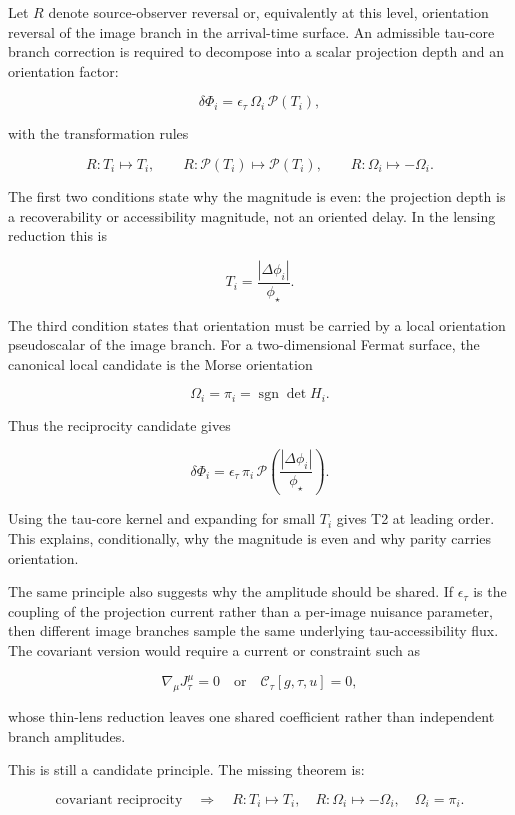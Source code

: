 \documentclass[11pt]{article}
\begin{document}
Let \(R\) denote source-observer reversal or, equivalently at this
level, orientation reversal of the image branch in the arrival-time
surface. An admissible tau-core branch correction is required to
decompose into a scalar projection depth and an orientation factor:

\[
\delta\Phi_i
=
\epsilon_\tau\,\Omega_i\,\mathcal{P}(T_i),
\]

with the transformation rules

\[
R:T_i\mapsto T_i,
\qquad
R:\mathcal{P}(T_i)\mapsto \mathcal{P}(T_i),
\qquad
R:\Omega_i\mapsto -\Omega_i.
\]

The first two conditions state why the magnitude is even: the projection
depth is a recoverability or accessibility magnitude, not an oriented
delay. In the lensing reduction this is

\[
T_i=\frac{|\Delta\phi_i|}{\phi_\star}.
\]

The third condition states that orientation must be carried by a local
orientation pseudoscalar of the image branch. For a two-dimensional
Fermat surface, the canonical local candidate is the Morse orientation

\[
\Omega_i=\pi_i=\operatorname{sgn}\det H_i.
\]

Thus the reciprocity candidate gives

\[
\delta\Phi_i
=
\epsilon_\tau\,\pi_i\,\mathcal{P}
\left(\frac{|\Delta\phi_i|}{\phi_\star}\right).
\]

Using the tau-core kernel and expanding for small \(T_i\) gives T2 at
leading order. This explains, conditionally, why the magnitude is even
and why parity carries orientation.

The same principle also suggests why the amplitude should be shared. If
\(\epsilon_\tau\) is the coupling of the projection current rather than
a per-image nuisance parameter, then different image branches sample the
same underlying tau-accessibility flux. The covariant version would
require a current or constraint such as

\[
\nabla_\mu J^\mu_\tau=0
\quad \text{or} \quad
\mathcal{C}_\tau[g,\tau,u]=0,
\]

whose thin-lens reduction leaves one shared coefficient rather than
independent branch amplitudes.

This is still a candidate principle. The missing theorem is:

\[
\text{covariant reciprocity}
\quad\Longrightarrow\quad
R:T_i\mapsto T_i,\quad
R:\Omega_i\mapsto-\Omega_i,\quad
\Omega_i=\pi_i.
\]
\end{document}
